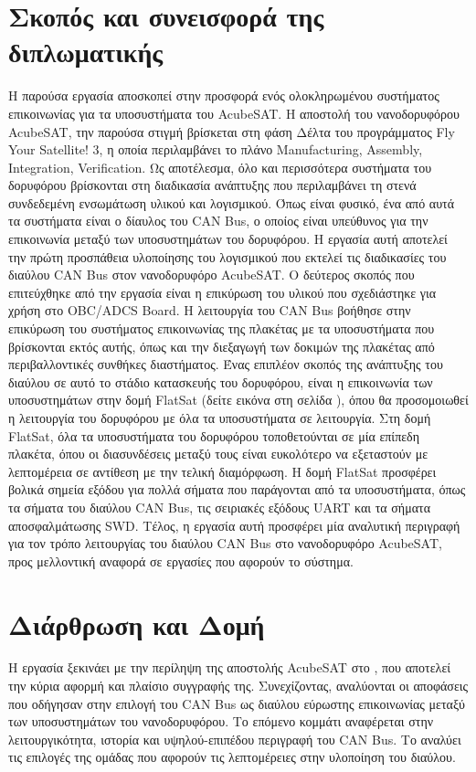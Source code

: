 \documentclass[a4paper,nobib,justified]{tufte-book}
\begin{document}
\section{Σκοπός και συνεισφορά της διπλωματικής}
Η παρούσα εργασία αποσκοπεί στην προσφορά ενός ολοκληρωμένου συστήματος επικοινωνίας για τα υποσυστήματα του AcubeSAT. Η αποστολή του νανοδορυφόρου AcubeSAT, την παρούσα στιγμή βρίσκεται στη φάση Δέλτα του προγράμματος Fly Your Satellite! 3, η οποία περιλαμβάνει το πλάνο Manufacturing, Assembly, Integration, Verification. Ως αποτέλεσμα, όλο και περισσότερα συστήματα του δορυφόρου βρίσκονται στη διαδικασία ανάπτυξης που περιλαμβάνει τη στενά συνδεδεμένη ενσωμάτωση υλικού και λογισμικού. Όπως είναι φυσικό, ένα από αυτά τα συστήματα είναι ο δίαυλος του CAN Bus, ο οποίος είναι υπεύθυνος για την επικοινωνία μεταξύ των υποσυστημάτων του δορυφόρου. Η εργασία αυτή αποτελεί την πρώτη προσπάθεια υλοποίησης του λογισμικού που εκτελεί τις διαδικασίες του διαύλου CAN Bus στον νανοδορυφόρο AcubeSAT. Ο δεύτερος σκοπός που επιτεύχθηκε από την εργασία είναι η επικύρωση του υλικού που σχεδιάστηκε για χρήση στο OBC/ADCS Board. Η λειτουργία του CAN Bus βοήθησε στην επικύρωση του συστήματος επικοινωνίας της πλακέτας με τα υποσυστήματα που βρίσκονται εκτός αυτής, όπως και την διεξαγωγή των δοκιμών της πλακέτας από περιβαλλοντικές συνθήκες διαστήματος. Ένας επιπλέον σκοπός της ανάπτυξης του διαύλου σε αυτό το στάδιο κατασκευής του δορυφόρου, είναι η επικοινωνία των υποσυστημάτων στην δομή FlatSat (δείτε εικόνα στη σελίδα \pageref{fig:flatsat}), όπου θα προσομοιωθεί η λειτουργία του δορυφόρου με όλα τα υποσυστήματα σε λειτουργία. Στη δομή FlatSat, όλα τα υποσυστήματα του δορυφόρου τοποθετούνται σε μία επίπεδη πλακέτα, όπου οι διασυνδέσεις μεταξύ τους είναι ευκολότερο να εξεταστούν με λεπτομέρεια σε αντίθεση με την τελική διαμόρφωση. Η δομή FlatSat προσφέρει βολικά σημεία εξόδου για πολλά σήματα που παράγονται από τα υποσυστήματα, όπως τα σήματα του διαύλου CAN Bus, τις σειριακές εξόδους UART και τα σήματα αποσφαλμάτωσης SWD. Τέλος, η εργασία αυτή προσφέρει μία αναλυτική περιγραφή για τον τρόπο λειτουργίας του διαύλου CAN Bus στο νανοδορυφόρο AcubeSAT, προς μελλοντική αναφορά σε εργασίες που αφορούν το σύστημα.

\section{Διάρθρωση και Δομή}
Η εργασία ξεκινάει με την περίληψη της αποστολής AcubeSAT στο , που αποτελεί την κύρια αφορμή και πλαίσιο συγγραφής της. Συνεχίζοντας, αναλύονται οι αποφάσεις που οδήγησαν στην επιλογή του CAN Bus ως διαύλου εύρωστης επικοινωνίας μεταξύ των υποσυστημάτων του νανοδορυφόρου. Το επόμενο κομμάτι αναφέρεται στην λειτουργικότητα, ιστορία και υψηλού-επιπέδου περιγραφή του CAN Bus. Το  αναλύει τις επιλογές της ομάδας που αφορούν τις λεπτομέρειες στην υλοποίηση του διαύλου.
\end{document}

